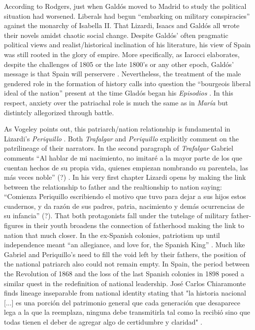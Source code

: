 \documentclass[12pt]{report}
\begin{document}
According to Rodgers, just when Galdós moved to Madrid to study the political situation had worsened.
Liberals had begun \enquote{embarking on military conspiracies} against the monarchy of Isabella II.
That Lizardi, Isaacs and Galdós all wrote their novels amidst chaotic social change.
Despite Galdós' often pragmatic political views and realist/historical inclination of his literature, his view of Spain was still rooted in the glory of empire. 
More specifically, as Iarocci elaborates, despite the challenges of 1805 or the late 1800's or any other epoch, Galdós' message is that Spain will perservere \cite[200]{Iarocci2004}.
Nevertheless, the treatment of the male gendered role in the formation of history calls into question the \enquote{bourgeois liberal ideal of the nation} present at the time Gladós began his \textit{Episodios} \cite[200]{Iarocci2004}.
In this respect, anxiety over the patriachal role is much the same as in \textit{María} but distintcly allegorized through battle.

As Vogeley points out, this patriarch/nation relationship is fundamental in Lizardi's \textit{Periquillo} \cite[99]{Vogeley2001}.
Both \textit{Trafalgar} and \textit{Periquillo} explicitly comment on the patrilineage of their narrators.
In the second paragraph of \textit{Trafalgar} Gabriel comments \enquote{Al hablar de mi nacimiento, no imitaré a la mayor parte de los que
cuentan hechos de su propia vida, quienes empiezan nombrando su parentela, las más veces noble} (?) \cite[add. text]{Galdós...}.
In his very first chapter Lizardi opens by making the link between the relationship to father and the realtionship to nation saying: \enquote{Comienza Periquillo escribiendo el motivo que tuvo para dejar a sus hijos estos cuadernos, y da razón de sus padres, patria, nacimiento y demás ocurrencias de su infancia} (?). 
That both protagonists fall under the tutelage of military father-figures in their youth broadens the connection of fatherhood making the link to nation that much closer.
In the ex-Spanish colonies, patriotism up until independence meant \enquote{an allegiance, and love for, the Spanish King} \cite[94]{Vogeley2001}.
Much like Gabriel and Periquillo's need to fill the void left by their fathers, the position of the national patriarch also could not remain empty.
In Spain, the period between the Revolution of 1868 and the loss of the last Spanish colonies in 1898 posed a similar quest in the redefinition of national leadership.
José Carlos Chiaramonte finds lineage inseparable from national identity stating that "la historia nacional [...] es una porción del patrimonio general que cada generación que desaparece lega a la que la reemplaza, ninguna debe transmitirla tal como la recibió sino que todas tienen el deber de agregar algo de certidumbre y claridad" \cite[28]{Chiaramonte2004}.
\end{document}
